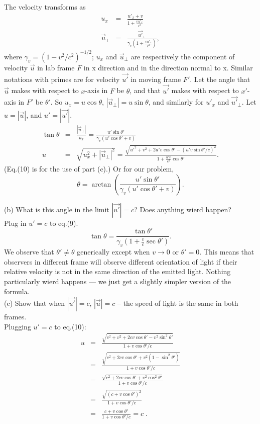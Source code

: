 \begin{enumerate}
The velocity transforms as
\begin{eqnarray}
u_x &=& \frac{u'_x+v}{1+\frac{vu'_x}{c^2}}\\
\vec{u}_{\bot} &=& \frac{\vec{u'}_{\bot}}{\gamma_v (1+\frac{vu'_x}{c^2})},
\end{eqnarray}
where $\gamma_v=(1-v^2/c^2)^{-1/2}$; $u_x$ and $\vec{u}_{\bot}$ are
respectively the component of velocity $\vec{u}$ in lab frame $F$ in x
direction and in the direction normal to x.  Similar notations with
primes are for velocity $\vec{u'}$ in moving frame $F'$.  Let the
angle that $\vec{u}$ makes with respect to $x$-axis in $F$ be
$\theta$, and that $\vec{u'}$ makes with respect to $x'$-axis in $F'$
be $\theta '$.  So $u_x=u\cos{\theta}$,
$|\vec{u}_{\bot}|=u\sin{\theta}$, and similarly for $u'_x$ and
$\vec{u'}_{\bot}$.  Let $u=|\vec{u}|$, and $u'=|\vec{u'}|$.
\begin{eqnarray}
\tan{\theta} &=& \frac{|\vec{u}_{\bot}|}{u_x}= \frac{u'\sin{\theta'}}
{\gamma_v(u'\cos{\theta'}+v)}\\
u &=& \sqrt{u_x^2+|\vec{u}_{\bot}|^2}=
\frac{\sqrt{u'^2+v^2+2u'v\cos{\theta'}-(u'v\sin{\theta'}/c)^2}}
{1+\frac{u'v}{c^2}\cos{\theta'}}.
\end{eqnarray}
(Eq.(10) is for the use of part (c).)  Or for our problem,
\[\theta=\arctan{\left(\frac{u'\sin{\theta'}}
{\gamma_v(u'\cos{\theta'}+v)}\right)}.\]

(b) What is this angle in the limit $|\vec{u'}|=c$? Does anything
wierd happen?\\

Plug in $u'=c$ to eq.(9).
\begin{equation}
\tan{\theta}=\frac{\tan{\theta'}}{\gamma_v (1+\frac{v}{c}\sec{\theta'})}.
\end{equation}
We observe that $\theta'\neq\theta$ generically except when
$v\rightarrow 0$ or $\theta'=0$.  This means that observers in
different frame will observe different orientation of light if their
relative velocity is not in the same direction of the emitted light.
Nothing particularly wierd happens --- we just get a slightly simpler
version of the formula.\\

(c) Show that when $|\vec{u'}|=c$, $|\vec{u}|=c$ -- the 
speed of light is the same in both frames.\\

Plugging $u'=c$ to eq.(10):
\begin{eqnarray*}
u &=& \frac{\sqrt{c^2+v^2+2cv\cos{\theta'}-v^2\sin^2\theta'}}
{1+v\cos{\theta'}/c}
\\
&=& \frac{\sqrt{c^2+2cv\cos\theta'+v^2(1 - \sin^2\theta')}}
{1+v\cos{\theta'}/c}
\\
&=& \frac{\sqrt{c^2+2cv\cos\theta'+v^2\cos^2\theta'}}
{1+v\cos{\theta'}/c}
\\
&=& \frac{\sqrt{(c + v\cos\theta')^2}}{1+v\cos{\theta'}/c}
\\
&=& \frac{c + v\cos\theta'}{1+v\cos{\theta'}/c} = c\;.
\end{eqnarray*}


\end{enumerate}
